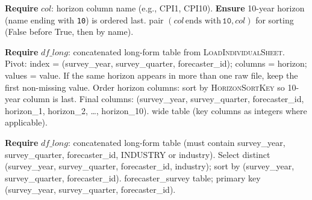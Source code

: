 \documentclass[11pt]{article}
\begin{document}
\begin{algorithm}[H]
\caption{\textsc{HorizonSortKey}$(\textit{col})$}
\begin{algorithmic}[1]
\State \textbf{Require} $\textit{col}$: horizon column name (e.g., CPI1, CPI10).
\State \textbf{Ensure} 10-year horizon (name ending with \texttt{10}) is ordered last.
\State \Return pair $(\textit{col}\,\text{ends with}\,\texttt{10}, \textit{col})$ for sorting (False before True, then by name).
\end{algorithmic}
\end{algorithm}

\begin{algorithm}[H]
\caption{\textsc{BuildForecastIndividual}$(\textit{df\_long})$}
\begin{algorithmic}[1]
\State \textbf{Require} $\textit{df\_long}$: concatenated long-form table from \textsc{LoadIndividualSheet}.
\State Pivot: index = (survey\_year, survey\_quarter, forecaster\_id); columns = horizon; values = value.
\State If the same horizon appears in more than one raw file, keep the first non-missing value.
\State Order horizon columns: sort by \textsc{HorizonSortKey} so 10-year column is last.
\State Final columns: (survey\_year, survey\_quarter, forecaster\_id, horizon\_1, horizon\_2, \ldots, horizon\_10).
\State \Return wide table (key columns as integers where applicable).
\end{algorithmic}
\end{algorithm}

\begin{algorithm}[H]
\caption{\textsc{BuildForecasterSurvey}$(\textit{df\_long})$}
\begin{algorithmic}[1]
\State \textbf{Require} $\textit{df\_long}$: concatenated long-form table (must contain survey\_year, survey\_quarter, forecaster\_id, INDUSTRY or industry).
\State Select distinct (survey\_year, survey\_quarter, forecaster\_id, industry); sort by (survey\_year, survey\_quarter, forecaster\_id).
\State \Return forecaster\_survey table; primary key (survey\_year, survey\_quarter, forecaster\_id).
\end{algorithmic}
\end{algorithm}
\end{document}
